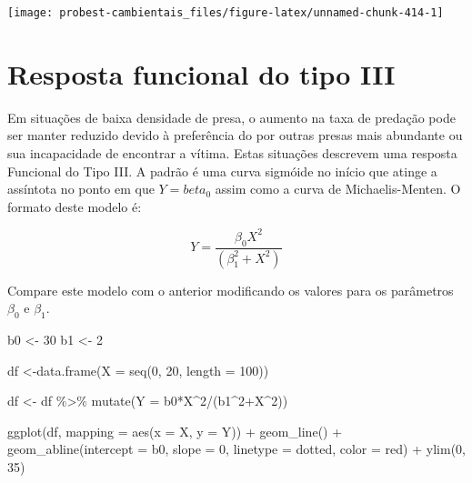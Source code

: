 \documentclass[
]{book}
\newenvironment{Shaded}{\begin{snugshade}}{\end{snugshade}}
\newcommand{\AttributeTok}[1]{\textcolor[rgb]{0.77,0.63,0.00}{#1}}
\newcommand{\DecValTok}[1]{\textcolor[rgb]{0.00,0.00,0.81}{#1}}
\newcommand{\FunctionTok}[1]{\textcolor[rgb]{0.00,0.00,0.00}{#1}}
\newcommand{\NormalTok}[1]{#1}
\newcommand{\OtherTok}[1]{\textcolor[rgb]{0.56,0.35,0.01}{#1}}
\newcommand{\SpecialCharTok}[1]{\textcolor[rgb]{0.00,0.00,0.00}{#1}}
\newcommand{\StringTok}[1]{\textcolor[rgb]{0.31,0.60,0.02}{#1}}
\begin{document}
\begin{center}\texttt{[image: probest-cambientais\_files/figure-latex/unnamed-chunk-414-1]} \end{center}

\hypertarget{resposta-funcional-do-tipo-iii}{%
\section{Resposta funcional do tipo III}\label{resposta-funcional-do-tipo-iii}}

Em situações de baixa densidade de presa, o aumento na taxa de predação pode ser manter reduzido devido à preferência do por outras presas mais abundante ou sua incapacidade de encontrar a vítima. Estas situações descrevem uma resposta Funcional do Tipo III. A padrão é uma curva sigmóide no início que atinge a assíntota no ponto em que \(Y = beta_0\) assim como a curva de Michaelis-Menten. O formato deste modelo é:

\[Y = \frac{\beta_0 X^2}{(\beta_1^2 + X^2)}\]

Compare este modelo com o anterior modificando os valores para os parâmetros \(\beta_0\) e \(\beta_1\).

\begin{Shaded}
\begin{Highlighting}[]
\NormalTok{b0 }\OtherTok{\textless{}{-}} \DecValTok{30}
\NormalTok{b1 }\OtherTok{\textless{}{-}} \DecValTok{2}

\NormalTok{df }\OtherTok{\textless{}{-}}\FunctionTok{data.frame}\NormalTok{(}\AttributeTok{X =} \FunctionTok{seq}\NormalTok{(}\DecValTok{0}\NormalTok{, }\DecValTok{20}\NormalTok{, }\AttributeTok{length =} \DecValTok{100}\NormalTok{))}

\NormalTok{df }\OtherTok{\textless{}{-}}\NormalTok{ df }\SpecialCharTok{\%\textgreater{}\%} \FunctionTok{mutate}\NormalTok{(}\AttributeTok{Y =}\NormalTok{ b0}\SpecialCharTok{*}\NormalTok{X}\SpecialCharTok{\^{}}\DecValTok{2}\SpecialCharTok{/}\NormalTok{(b1}\SpecialCharTok{\^{}}\DecValTok{2}\SpecialCharTok{+}\NormalTok{X}\SpecialCharTok{\^{}}\DecValTok{2}\NormalTok{))}

\FunctionTok{ggplot}\NormalTok{(df, }\AttributeTok{mapping =} \FunctionTok{aes}\NormalTok{(}\AttributeTok{x =}\NormalTok{ X, }\AttributeTok{y =}\NormalTok{ Y)) }\SpecialCharTok{+}
  \FunctionTok{geom\_line}\NormalTok{() }\SpecialCharTok{+}
  \FunctionTok{geom\_abline}\NormalTok{(}\AttributeTok{intercept =}\NormalTok{ b0, }\AttributeTok{slope =} \DecValTok{0}\NormalTok{, }\AttributeTok{linetype =} \StringTok{\textquotesingle{}dotted\textquotesingle{}}\NormalTok{, }\AttributeTok{color =} \StringTok{\textquotesingle{}red\textquotesingle{}}\NormalTok{) }\SpecialCharTok{+}
  \FunctionTok{ylim}\NormalTok{(}\DecValTok{0}\NormalTok{, }\DecValTok{35}\NormalTok{)}
\end{Highlighting}
\end{Shaded}
\end{document}
